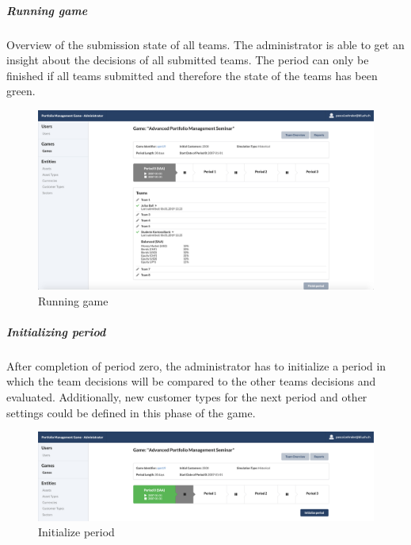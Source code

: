 \subparagraph{Running game}
Overview of the submission state of all teams. The administrator is able to get an insight about the decisions of all submitted teams. The period can only be finished if all teams submitted and therefore the state of the teams has been green.
\begin{figure}[h!]
  \centering
  \includegraphics[scale=0.2]{img/application-overview/administrator/07_running_game.png}
  \caption{Running game}
\end{figure}

\subparagraph{Initializing period}
After completion of period zero, the administrator has to initialize a period in which the team decisions will be compared to the other teams decisions and evaluated. Additionally, new customer types for the next period and other settings could be defined in this phase of the game.
\begin{figure}[h!]
  \centering
  \includegraphics[scale=0.2]{img/application-overview/administrator/08_period_initialization.png}
  \caption{Initialize period}
\end{figure}


